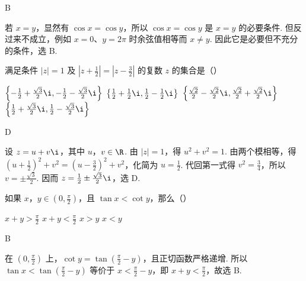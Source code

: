 \documentclass[UTF8,a4paper,oneside,11pt]{ctexbook}
\begin{document}
\begin{answer}
B
\end{answer}

\begin{solution}
若 \(x=y\)，显然有 \(\cos x=\cos y\)，所以 \(\cos x=\cos y\) 是 \(x=y\) 的必要条件. 但反过来不成立，例如 \(x=0\)、\(y=2\pi\) 时余弦值相等而 \(x\neq y\). 因此它是必要但不充分的条件，选 B.
\end{solution}

\begin{problem}
满足条件 \(|z|=1\) 及 \(\left|z+\frac{1}{2}\right|=\left|z-\frac{3}{2}\right|\) 的复数 \(z\) 的集合是（\quad）

\choices
    {\(\left\{-\frac{1}{2}+\frac{\sqrt{3}}{2}\i,-\frac{1}{2}-\frac{\sqrt{3}}{2}\i\right\}\)}
    {\(\left\{\frac{1}{2}+\frac{1}{2}\i,\frac{1}{2}-\frac{1}{2}\i\right\}\)}
    {\(\left\{\frac{\sqrt{2}}{2}-\frac{\sqrt{2}}{2}\i,\frac{\sqrt{2}}{2}+\frac{\sqrt{2}}{2}\i\right\}\)}
    {\(\left\{\frac{1}{2}+\frac{\sqrt{3}}{2}\i,\frac{1}{2}-\frac{\sqrt{3}}{2}\i\right\}\)}
\end{problem}

\begin{answer}
D
\end{answer}

\begin{solution}
设 \(z=u+v\i\)，其中 \(u\)，\(v\in\R\). 由 \(|z|=1\)，得 \(u^2+v^2=1\). 由两个模相等，得 \((u+\frac12)^2+v^2=(u-\frac32)^2+v^2\)，化简为 \(u=\frac12\). 代回第一式得 \(v^2=\frac34\)，所以 \(v=\pm\frac{\sqrt3}{2}\). 因而 \(z=\frac12\pm\frac{\sqrt3}{2}\i\)，选 D.
\end{solution}

\begin{problem}
如果 \(x\)，\(y\in\left(0,\frac{\pi}{2}\right)\)，且 \(\tan x<\cot y\)，那么（\quad）

\choices
    {\(x+y>\frac{\pi}{2}\)}
    {\(x+y<\frac{\pi}{2}\)}
    {\(x>y\)}
    {\(x<y\)}
\end{problem}

\begin{answer}
B
\end{answer}

\begin{solution}
在 \(\left(0,\frac\pi2\right)\) 上，\(\cot y=\tan\left(\frac\pi2-y\right)\)，且正切函数严格递增. 所以 \(\tan x<\tan\left(\frac\pi2-y\right)\) 等价于 \(x<\frac\pi2-y\)，即 \(x+y<\frac\pi2\)，故选 B.
\end{solution}
\end{document}
